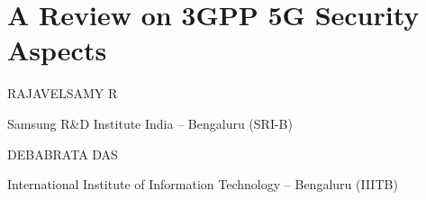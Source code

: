 \chapter{A Review on 3GPP 5G Security Aspects}

\begin{center}
{\large\uppercase{Rajavelsamy R}} 

\vskip -6pt

Samsung R\&D Institute India – Bengaluru (SRI-B)

\bigskip
{\large\uppercase{Debabrata Das}} 

\vskip -6pt

International Institute of Information Technology – Bengaluru (IIITB)
\end{center}

\noindent{}

\newpage

